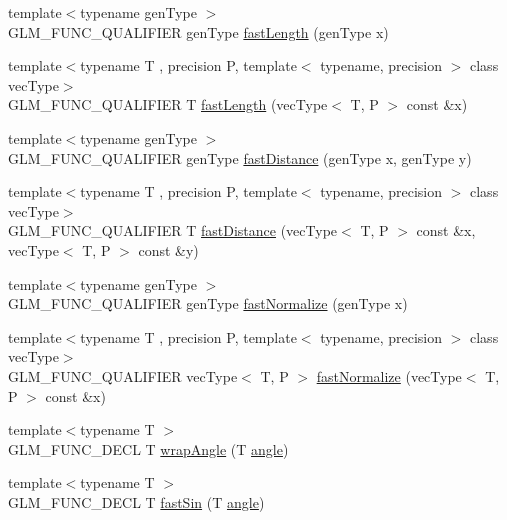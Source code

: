 \begin{DoxyCompactItemize}
\item 
{\footnotesize template$<$typename gen\+Type $>$ }\\G\+L\+M\+\_\+\+F\+U\+N\+C\+\_\+\+Q\+U\+A\+L\+I\+F\+I\+E\+R gen\+Type \hyperlink{group__gtx__fast__square__root_gafe697d6287719538346bbdf8b1367c59}{fast\+Length} (gen\+Type x)
\item 
{\footnotesize template$<$typename T , precision P, template$<$ typename, precision $>$ class vec\+Type$>$ }\\G\+L\+M\+\_\+\+F\+U\+N\+C\+\_\+\+Q\+U\+A\+L\+I\+F\+I\+E\+R T \hyperlink{group__gtx__fast__square__root_gae28a3099cbd6404a4ea8ef22147ed7b0}{fast\+Length} (vec\+Type$<$ T, P $>$ const \&x)
\item 
{\footnotesize template$<$typename gen\+Type $>$ }\\G\+L\+M\+\_\+\+F\+U\+N\+C\+\_\+\+Q\+U\+A\+L\+I\+F\+I\+E\+R gen\+Type \hyperlink{group__gtx__fast__square__root_gaac333418d0c4e0cc6d3d219ed606c238}{fast\+Distance} (gen\+Type x, gen\+Type y)
\item 
{\footnotesize template$<$typename T , precision P, template$<$ typename, precision $>$ class vec\+Type$>$ }\\G\+L\+M\+\_\+\+F\+U\+N\+C\+\_\+\+Q\+U\+A\+L\+I\+F\+I\+E\+R T \hyperlink{group__gtx__fast__square__root_ga6d1ac559cd77d69119e30c3aca0e14b5}{fast\+Distance} (vec\+Type$<$ T, P $>$ const \&x, vec\+Type$<$ T, P $>$ const \&y)
\item 
{\footnotesize template$<$typename gen\+Type $>$ }\\G\+L\+M\+\_\+\+F\+U\+N\+C\+\_\+\+Q\+U\+A\+L\+I\+F\+I\+E\+R gen\+Type \hyperlink{namespaceglm_ae90408b1ac7a31212f0de6e19f6373aa}{fast\+Normalize} (gen\+Type x)
\item 
{\footnotesize template$<$typename T , precision P, template$<$ typename, precision $>$ class vec\+Type$>$ }\\G\+L\+M\+\_\+\+F\+U\+N\+C\+\_\+\+Q\+U\+A\+L\+I\+F\+I\+E\+R vec\+Type$<$ T, P $>$ \hyperlink{namespaceglm_a30d366d62d66b3de535a2ec6dedcb370}{fast\+Normalize} (vec\+Type$<$ T, P $>$ const \&x)
\item 
{\footnotesize template$<$typename T $>$ }\\G\+L\+M\+\_\+\+F\+U\+N\+C\+\_\+\+D\+E\+C\+L T \hyperlink{group__gtx__fast__trigonometry_ga069527c6dbd64f53435b8ebc4878b473}{wrap\+Angle} (T \hyperlink{group__gtc__quaternion_gad4a4448baedb198b2b1e7880d2544dc9}{angle})
\item 
{\footnotesize template$<$typename T $>$ }\\G\+L\+M\+\_\+\+F\+U\+N\+C\+\_\+\+D\+E\+C\+L T \hyperlink{group__gtx__fast__trigonometry_ga0aab3257bb3b628d10a1e0483e2c6915}{fast\+Sin} (T \hyperlink{group__gtc__quaternion_gad4a4448baedb198b2b1e7880d2544dc9}{angle})

\end{DoxyCompactItemize}
